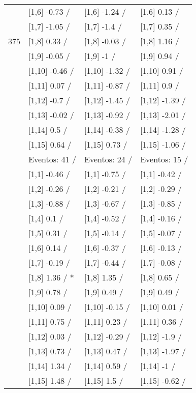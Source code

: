 \begin{table}
\begin{tabular}[t]{llll}
 & {}[1,6] -0.73  / & {}[1,6] -1.24  / & {}[1,6] 0.13  /\\
 & {}[1,7] -1.05  / & {}[1,7] -1.4  / & {}[1,7] 0.35  /\\
375 & {}[1,8] 0.33  / & {}[1,8] -0.03  / & {}[1,8] 1.16  /\\
\addlinespace
 & {}[1,9] -0.05  / & {}[1,9] -1  / & {}[1,9] 0.94  /\\
 & {}[1,10] -0.46  / & {}[1,10] -1.32  / & {}[1,10] 0.91  /\\
 & {}[1,11] 0.07  / & {}[1,11] -0.87  / & {}[1,11] 0.9  /\\
 & {}[1,12] -0.7  / & {}[1,12] -1.45  / & {}[1,12] -1.39  /\\
 & {}[1,13] -0.02  / & {}[1,13] -0.92  / & {}[1,13] -2.01  /\\
\addlinespace
 & {}[1,14] 0.5  / & {}[1,14] -0.38  / & {}[1,14] -1.28  /\\
 & {}[1,15] 0.64  / & {}[1,15] 0.73  / & {}[1,15] -1.06  /\\
 & Eventos:  41 / & Eventos:  24 / & Eventos:  15 /\\
 & {}[1,1] -0.46  / & {}[1,1] -0.75  / & {}[1,1] -0.42  /\\
 & {}[1,2] -0.26  / & {}[1,2] -0.21  / & {}[1,2] -0.29  /\\
\addlinespace
 & {}[1,3] -0.88  / & {}[1,3] -0.67  / & {}[1,3] -0.85  /\\
 & {}[1,4] 0.1  / & {}[1,4] -0.52  / & {}[1,4] -0.16  /\\
 & {}[1,5] 0.31  / & {}[1,5] -0.14  / & {}[1,5] -0.07  /\\
 & {}[1,6] 0.14  / & {}[1,6] -0.37  / & {}[1,6] -0.13  /\\
 & {}[1,7] -0.19  / & {}[1,7] -0.44  / & {}[1,7] -0.08  /\\
\addlinespace
500 & {}[1,8] 1.36  / * & {}[1,8] 1.35  / & {}[1,8] 0.65  /\\
 & {}[1,9] 0.78  / & {}[1,9] 0.49  / & {}[1,9] 0.49  /\\
 & {}[1,10] 0.09  / & {}[1,10] -0.15  / & {}[1,10] 0.01  /\\
 & {}[1,11] 0.75  / & {}[1,11] 0.23  / & {}[1,11] 0.36  /\\
 & {}[1,12] 0.03  / & {}[1,12] -0.29  / & {}[1,12] -1.9  /\\
\addlinespace
 & {}[1,13] 0.73  / & {}[1,13] 0.47  / & {}[1,13] -1.97  /\\
 & {}[1,14] 1.34  / & {}[1,14] 0.59  / & {}[1,14] -1  /\\
 & {}[1,15] 1.48  / & {}[1,15] 1.5  / & {}[1,15] -0.62  /\\
\bottomrule
\end{tabular}
\end{table}
